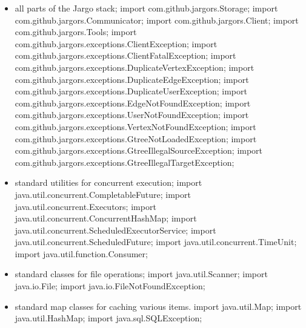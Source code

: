 \begin{itemize}
\item all parts of the Jargo stack;
\nwenddocs{}\plusendmoddef
import com.github.jargors.Storage;
import com.github.jargors.Communicator;
import com.github.jargors.Client;
import com.github.jargors.Tools;
import com.github.jargors.exceptions.ClientException;
import com.github.jargors.exceptions.ClientFatalException;
import com.github.jargors.exceptions.DuplicateVertexException;
import com.github.jargors.exceptions.DuplicateEdgeException;
import com.github.jargors.exceptions.DuplicateUserException;
import com.github.jargors.exceptions.EdgeNotFoundException;
import com.github.jargors.exceptions.UserNotFoundException;
import com.github.jargors.exceptions.VertexNotFoundException;
import com.github.jargors.exceptions.GtreeNotLoadedException;
import com.github.jargors.exceptions.GtreeIllegalSourceException;
import com.github.jargors.exceptions.GtreeIllegalTargetException;
\nwendcode{}\item standard utilities for concurrent execution;
\nwenddocs{}\plusendmoddef
import java.util.concurrent.CompletableFuture;
import java.util.concurrent.Executors;
import java.util.concurrent.ConcurrentHashMap;
import java.util.concurrent.ScheduledExecutorService;
import java.util.concurrent.ScheduledFuture;
import java.util.concurrent.TimeUnit;
import java.util.function.Consumer;
\nwendcode{}\item standard classes for file operations;
\nwenddocs{}\plusendmoddef
import java.util.Scanner;
import java.io.File;
import java.io.FileNotFoundException;
\nwendcode{}\item standard map classes for caching various items.
\nwenddocs{}\plusendmoddef
import java.util.Map;
import java.util.HashMap;
\nwendcode{}\nwdocspar
\nwenddocs{}\plusendmoddef
import java.sql.SQLException;
\nwendcode{}\nwdocspar
\end{itemize}

